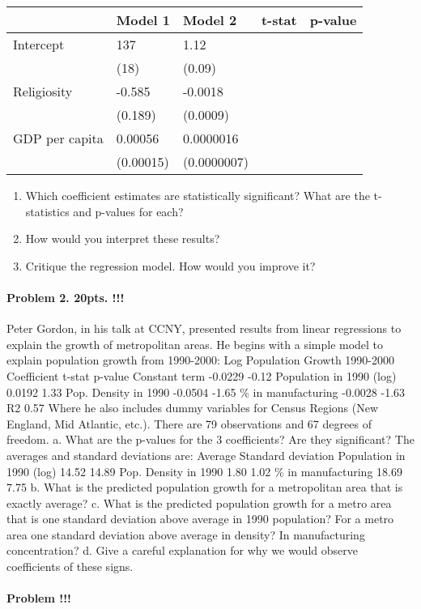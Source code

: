 \documentclass[]{article}
\providecommand{\tightlist}{%
  \setlength{\itemsep}{0pt}\setlength{\parskip}{0pt}}
\let\oldparagraph\paragraph
\renewcommand{\paragraph}[1]{\oldparagraph{#1}\mbox{}}
\begin{document}
\begin{longtable}[]{@{}lllll@{}}
\toprule
& Model 1 & Model 2 & t-stat & p-value\tabularnewline
\midrule
\endhead
Intercept & 137 & 1.12 & &\tabularnewline
& (18) & (0.09) & &\tabularnewline
Religiosity & -0.585 & -0.0018 & &\tabularnewline
& (0.189) & (0.0009) & &\tabularnewline
GDP per capita & 0.00056 & 0.0000016 & &\tabularnewline
& (0.00015) & (0.0000007) & &\tabularnewline
\bottomrule
\end{longtable}

\begin{enumerate}
\def\labelenumi{\alph{enumi}.}
\tightlist
\item
  Which coefficient estimates are statistically significant? What are
  the t-statistics and p-values for each?
\item
  How would you interpret these results?
\item
  Critique the regression model. How would you improve it?
\end{enumerate}

\paragraph{Problem 2. 20pts. !!!}\label{problem-2.-20pts.}

Peter Gordon, in his talk at CCNY, presented results from linear
regressions to explain the growth of metropolitan areas. He begins with
a simple model to explain population growth from 1990-2000: Log
Population Growth 1990-2000 Coefficient t-stat p-value Constant term
-0.0229 -0.12 Population in 1990 (log) 0.0192 1.33 Pop. Density in 1990
-0.0504 -1.65 \% in manufacturing -0.0028 -1.63 R2 0.57 Where he also
includes dummy variables for Census Regions (New England, Mid Atlantic,
etc.). There are 79 observations and 67 degrees of freedom. a. What are
the p-values for the 3 coefficients? Are they significant? The averages
and standard deviations are: Average Standard deviation Population in
1990 (log) 14.52 14.89 Pop. Density in 1990 1.80 1.02 \% in
manufacturing 18.69 7.75 b. What is the predicted population growth for
a metropolitan area that is exactly average? c. What is the predicted
population growth for a metro area that is one standard deviation above
average in 1990 population? For a metro area one standard deviation
above average in density? In manufacturing concentration? d. Give a
careful explanation for why we would observe coefficients of these
signs.

\paragraph{Problem !!!}\label{problem-6}
\end{document}
